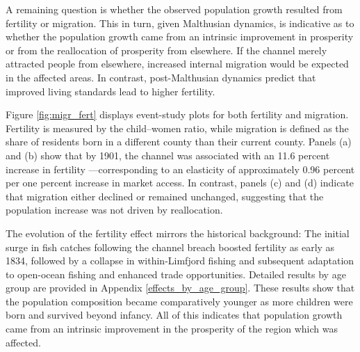 \documentclass[12pt]{article}
\begin{document}
A remaining question is whether the observed population growth resulted from fertility or migration. This in turn, given Malthusian dynamics, is indicative as to whether the population growth came from an intrinsic improvement in prosperity or from the reallocation of prosperity from elsewhere. If the channel merely attracted people from elsewhere, increased internal migration would be expected in the affected areas. In contrast, post-Malthusian dynamics \citep{Jensen2022, Klemp2016} predict that improved living standards lead to higher fertility.

Figure \ref{fig:migr_fert} displays event-study plots for both fertility and migration. Fertility is measured by the child–women ratio, while migration is defined as the share of residents born in a different county than their current county. Panels (a) and (b) show that by 1901, the channel was associated with an 11.6 percent increase in fertility —corresponding to an elasticity of approximately 0.96 percent per one percent increase in market access. In contrast, panels (c) and (d) indicate that migration either declined or remained unchanged, suggesting that the population increase was not driven by reallocation. 

The evolution of the fertility effect mirrors the historical background: The initial surge in fish catches following the channel breach boosted fertility as early as 1834, followed by a collapse in within-Limfjord fishing and subsequent adaptation to open-ocean fishing and enhanced trade opportunities. Detailed results by age group are provided in Appendix \ref{effects_by_age_group}. These results show that the population composition became comparatively younger as more children were born and survived beyond infancy. All of this indicates that population growth came from an intrinsic improvement in the prosperity of the region which was affected. 
\end{document}
